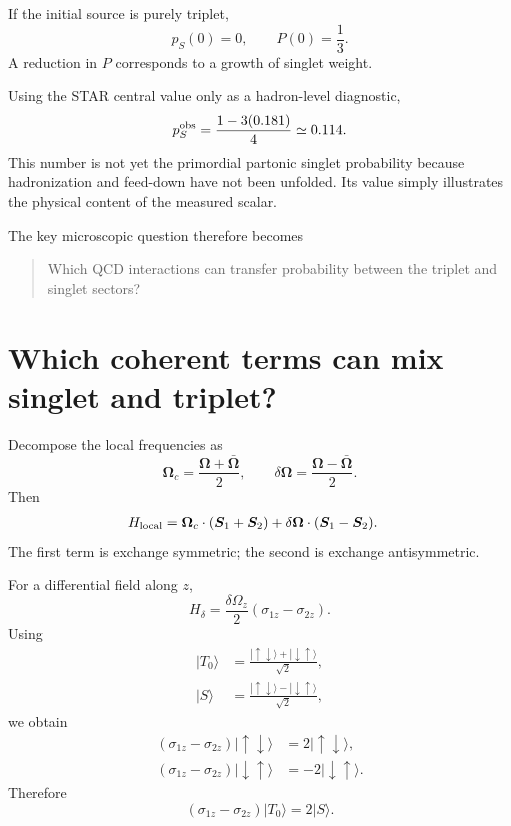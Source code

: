 \documentclass[11pt]{article}
\begin{document}
If the initial source is purely triplet,
\begin{equation}
p_S(0)=0,
\qquad
P(0)=\frac13.
\end{equation}
A reduction in $P$ corresponds to a growth of singlet weight.

Using the STAR central value only as a hadron-level diagnostic,
\begin{equation}
p_S^{\rm obs}
=
\frac{1-3(0.181)}{4}
\simeq 0.114.
\end{equation}
This number is not yet the primordial partonic singlet probability because hadronization and
feed-down have not been unfolded. Its value simply illustrates the physical content of the measured
scalar.

The key microscopic question therefore becomes
\begin{quote}
Which QCD interactions can transfer probability between the triplet and singlet sectors?
\end{quote}

\section{Which coherent terms can mix singlet and triplet?}

Decompose the local frequencies as
\begin{equation}
\bm\Omega_c
=
\frac{\bm\Omega+\bar{\bm\Omega}}{2},
\qquad
\delta\bm\Omega
=
\frac{\bm\Omega-\bar{\bm\Omega}}{2}.
\end{equation}
Then
\begin{align}
H_{\rm local}
&=
\bm\Omega_c\cdot(\bm S_1+\bm S_2)
+
\delta\bm\Omega\cdot(\bm S_1-\bm S_2).
\end{align}
The first term is exchange symmetric; the second is exchange antisymmetric.

For a differential field along $z$,
\begin{equation}
H_\delta
=
\frac{\delta\Omega_z}{2}
(\sigma_{1z}-\sigma_{2z}).
\end{equation}
Using
\begin{align}
|T_0\rangle
&=
\frac{
|\uparrow\downarrow\rangle+
|\downarrow\uparrow\rangle
}{\sqrt2},\\
|S\rangle
&=
\frac{
|\uparrow\downarrow\rangle-
|\downarrow\uparrow\rangle
}{\sqrt2},
\end{align}
we obtain
\begin{align}
(\sigma_{1z}-\sigma_{2z})|\uparrow\downarrow\rangle
&=2|\uparrow\downarrow\rangle,\\
(\sigma_{1z}-\sigma_{2z})|\downarrow\uparrow\rangle
&=-2|\downarrow\uparrow\rangle.
\end{align}
Therefore
\begin{equation}
\boxed{
(\sigma_{1z}-\sigma_{2z})|T_0\rangle
=
2|S\rangle.
}
\end{equation}
\end{document}
